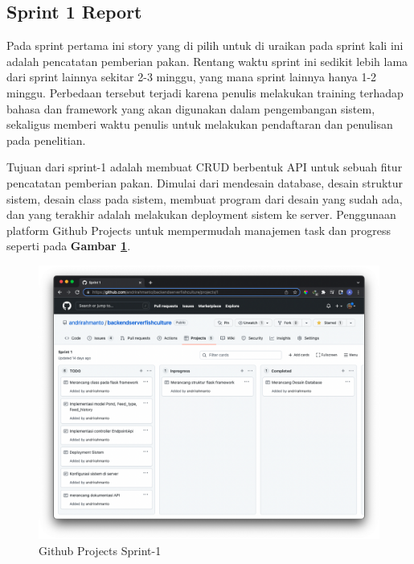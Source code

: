 
\subsection{Sprint 1 Report}
	
	Pada sprint pertama ini story yang di pilih untuk di uraikan pada sprint kali ini adalah pencatatan pemberian pakan. Rentang waktu sprint ini sedikit lebih lama dari sprint lainnya sekitar 2-3 minggu, yang mana sprint lainnya hanya 1-2 minggu. Perbedaan tersebut terjadi karena penulis melakukan training terhadap bahasa dan framework yang akan digunakan dalam pengembangan sistem, sekaligus memberi waktu penulis untuk melakukan pendaftaran dan penulisan pada penelitian.
	
	Tujuan dari sprint-1 adalah membuat CRUD berbentuk API untuk sebuah fitur pencatatan pemberian pakan. Dimulai dari mendesain database, desain struktur sistem, desain class pada sistem, membuat program dari desain yang sudah ada, dan yang terakhir adalah melakukan deployment sistem ke server. Penggunaan platform Github Projects untuk mempermudah manajemen task dan progress seperti pada \textbf{Gambar \ref{fig:github_projects_sprint01}}.
	
\begin{figure}[H]
	\centering
	\includegraphics[width=1\textwidth]{gambar/Sprint01/github_project_sprint01.png}
	\caption{Github Projects Sprint-1}
	\label{fig:github_projects_sprint01}
\end{figure}

